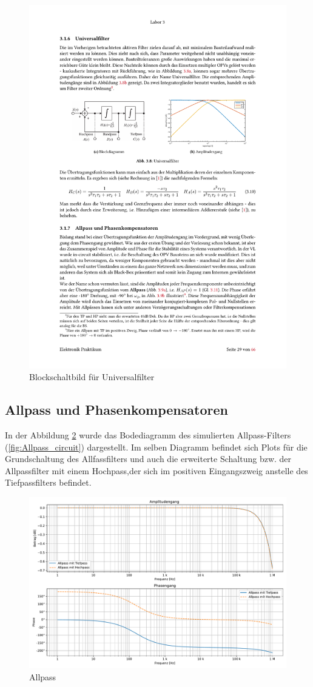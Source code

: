 \begin{figure}[H]
 \centering
 \includegraphics[width=0.7\linewidth]{Elektronik-Laborprotokoll_Filter/Plots/Universalfilter_Block.pdf}
 \caption{ Blockschaltbild für Universalfilter \cite{Skript} }
 \label{fig:Universal_Block}
\end{figure}


\subsection{Allpass und Phasenkompensatoren}

In der Abbildung \ref{fig:Allpass} wurde das Bodediagramm des simulierten Allpass-Filters (\ref{fig:Allpass_circuit})  dargestellt. Im selben Diagramm befindet sich Plots für die Grundschaltung des Allfassfilters und auch die erweiterte Schaltung bzw. der Allpassfilter mit einem Hochpass,der sich im positiven Eingangszweig anstelle des Tiefpassfilters befindet.

\begin{figure}[H]
 \centering
 \includegraphics[width=0.7\linewidth]{Elektronik-Laborprotokoll_Filter/Plots/Allpass_Bodediagramm_Simulation_mit_Messung.pdf}
 \caption{Allpass }
 \label{fig:Allpass}
\end{figure}

